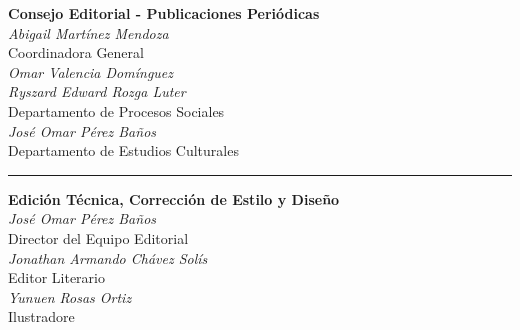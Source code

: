 \begin{center}
        {\montserrat\large\textbf{Consejo Editorial - Publicaciones Periódicas}} \\
        \vspace{0.2cm}
        \textit{Abigail Martínez Mendoza} \\
        Coordinadora General \\
        \vspace{0.1cm}
        \textit{Omar Valencia Domínguez} \\
        \textit{Ryszard Edward Rozga Luter} \\
        Departamento de Procesos Sociales \\
        \vspace{0.1cm}
        \textit{José Omar Pérez Baños} \\
        Departamento de Estudios Culturales \\
        
        \rule{0.6\textwidth}{0.4pt}
        
        {\montserrat\large\textbf{Edición Técnica, Corrección de Estilo y Diseño}} \\
        \vspace{0.2cm}
        \textit{José Omar Pérez Baños} \\
        Director del Equipo Editorial \\
        \vspace{0.1cm}
        \textit{Jonathan Armando Chávez Solís} \\
        Editor Literario\\
        \textit{Yunuen Rosas Ortiz} \\
        Ilustradore \\
      \end{center}
  \endgroup
\clearpage

